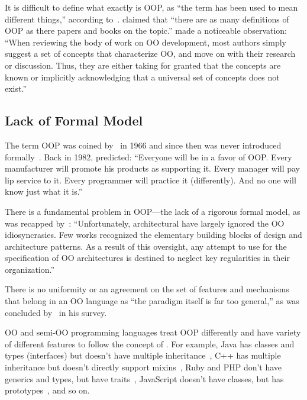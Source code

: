 It is difficult to define what exactly is OOP, as
``the term has been used to mean different things,'' according to~\citet{stefik1985object}.
\citet{madsen1988object} claimed that ``there are as many
definitions of OOP as there papers and books on the topic.''
\citet{armstrong2006quarks} made a noticeable observation: ``When
reviewing the body of work on OO development, most authors simply suggest a set
of concepts that characterize OO, and move on with their research or discussion.
Thus, they are either taking for granted that the concepts are known or implicitly
acknowledging that a universal set of concepts does not exist.''

\subsection{Lack of Formal Model}

The term OOP was coined by~\citet{kay97keynote} in 1966
and since then was never introduced formally~\citep{kaymaster68}.
Back in 1982, \citet{rentsch1982object} predicted: ``Everyone will be in a favor
of OOP. Every manufacturer will promote his products as supporting it. Every
manager will pay lip service to it. Every programmer will practice
it (differently). And no one will know just what it is.''

There is a fundamental problem in OOP---the lack of a rigorous formal model,
as was recapped by~\citet{eden2001principles}: ``Unfortunately, architectural
 have largely ignored the OO idiosyncrasies. Few works recognized the
elementary building blocks of design and architecture patterns.
As a result of this oversight, any attempt to use  for the specification of OO
architectures is destined to neglect key regularities in their organization.''

There is no uniformity or an agreement on the set of features and mechanisms
that belong in an OO language as ``the paradigm itself is far too general,'' as was
concluded by~\citet{nierstrasz1989survey} in his survey.

OO and semi-OO programming languages treat OOP differently and have variety of
different features to follow the concept of . For
example, Java has classes and types (interfaces) but doesn't
have multiple inheritance~\citep{alpern2001efficient},
C++ has multiple inheritance but doesn't directly support mixins~\citep{burton2014using},
Ruby and PHP don't have generics and types, but have traits~\citep{bi2018typed},
JavaScript doesn't have classes, but has prototypes~\citep{richards2010analysis}, and so on.

